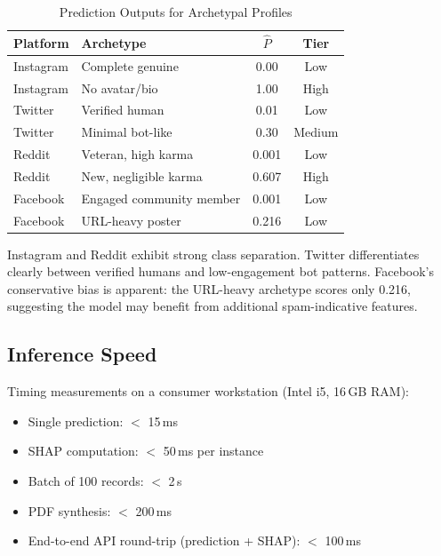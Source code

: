 \documentclass[conference]{IEEEtran}
\begin{document}
\begin{table}[htbp]
\caption{Prediction Outputs for Archetypal Profiles}
\label{tab:validation}
\centering
\begin{tabular}{llcc}
\toprule
\textbf{Platform} & \textbf{Archetype} & \textbf{$\hat{P}$} & \textbf{Tier} \\
\midrule
Instagram & Complete genuine & 0.00 & Low \\
Instagram & No avatar/bio & 1.00 & High \\
Twitter & Verified human & 0.01 & Low \\
Twitter & Minimal bot-like & 0.30 & Medium \\
Reddit & Veteran, high karma & 0.001 & Low \\
Reddit & New, negligible karma & 0.607 & High \\
Facebook & Engaged community member & 0.001 & Low \\
Facebook & URL-heavy poster & 0.216 & Low \\
\bottomrule
\end{tabular}
\end{table}

Instagram and Reddit exhibit strong class separation. Twitter differentiates clearly between verified humans and low-engagement bot patterns. Facebook's conservative bias is apparent: the URL-heavy archetype scores only 0.216, suggesting the model may benefit from additional spam-indicative features.

\subsection{Inference Speed}

Timing measurements on a consumer workstation (Intel i5, 16\,GB RAM):

\begin{itemize}
    \item Single prediction: $<$ 15\,ms
    \item SHAP computation: $<$ 50\,ms per instance
    \item Batch of 100 records: $<$ 2\,s
    \item PDF synthesis: $<$ 200\,ms
    \item End-to-end API round-trip (prediction + SHAP): $<$ 100\,ms
\end{itemize}

\end{document}
